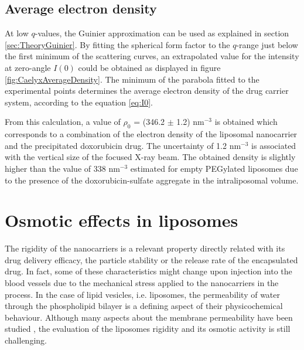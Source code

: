 \subsection{Average electron density}
At low $q$-values, the Guinier approximation can be used as explained in section \ref{sec:TheoryGuinier}. By fitting the spherical form factor to the $q$-range just below the first minimum of the scattering curves, an extrapolated value for the intensity at zero-angle $I(0)$ could be obtained as displayed in figure \ref{fig:CaelyxAverageDensity}. The minimum of the parabola fitted to the experimental points determines the average electron density of the drug carrier system, according to the equation \ref{eq:I0}.


From this calculation, a value of $\rho_0$ = (346.2 $\pm$ 1.2) nm$^{-3}$ is obtained which corresponds to a combination of the electron density of the liposomal nanocarrier and the precipitated doxorubicin drug. The uncertainty of 1.2 nm$^{-3}$ is associated with the vertical size of the focused X-ray beam. The obtained density is slightly higher than the value of 338 nm$^{-3}$ estimated for empty PEGylated liposomes \citep{kucerka_structure_2006} due to the presence of the doxorubicin-sulfate aggregate in the intraliposomal volume.

\section{Osmotic effects in liposomes}

The rigidity of the nanocarriers is a relevant property directly related with its drug delivery efficacy, the particle stability or the release rate of the encapsulated drug. In fact, some of these characteristics might change upon injection into the blood vessels due to the mechanical stress applied to the nanocarriers in the process. In the case of lipid vesicles, i.e. liposomes, the permeability of water through the phospholipid bilayer is a defining aspect of their physicochemical behaviour. Although many aspects about the membrane permeability have been studied \citep{nagle_theory_2008, mathai_structural_2008, olbrich_water_2000}, the evaluation of the liposomes rigidity and its osmotic activity is still challenging.

